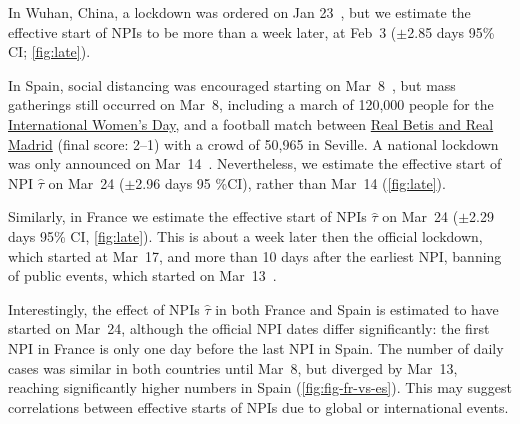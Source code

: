 \documentclass[12pt]{extarticle}
\begin{document}
In Wuhan, China, a lockdown was ordered on Jan 23~\citep{Li2020}, but we estimate the effective start of NPIs to be more than a week later, at Feb~3 ($\pm$2.85 days 95\% CI; \autoref{fig:late}).

In Spain, social distancing was encouraged starting on Mar~8~\citep{Flaxman2020}, but mass gatherings still occurred on Mar~8, including a march of 120,000 people for the \href{https://www.nytimes.com/2020/03/13/world/europe/spain-coronavirus-emergency.html}{International Women's Day}, and a  football match between \href{https://www.espn.com/soccer/match?gameId=550350}{Real Betis and Real Madrid} (final score: 2--1) with a crowd of 50,965 in Seville.
A national lockdown was only announced on Mar~14~\citep{Flaxman2020}.
Nevertheless, we estimate the effective start of NPI $\hat{\tau}$ on Mar~24 ($\pm$2.96 days 95 \%CI), rather than Mar~14 (\autoref{fig:late}).

Similarly, in France we estimate the effective start of NPIs $\hat{\tau}$ on Mar~24 ($\pm$2.29 days 95\% CI, \autoref{fig:late}). This is about a week later then the official lockdown, which started at Mar~17, and more than 10 days after the earliest NPI, banning of public events, which started on Mar~13~\citep{Flaxman2020}.

Interestingly, the effect of NPIs $\hat{\tau}$ in both France and Spain is estimated to have started on Mar~24, although the official NPI dates differ significantly: the first NPI in France is only one day before the last NPI in Spain.
The number of daily cases was similar in both countries until Mar~8, but diverged by Mar~13, reaching significantly higher numbers in Spain (\autoref{fig:fig-fr-vs-es}).
This may suggest correlations between effective starts of NPIs due to global or international events.
\end{document}
